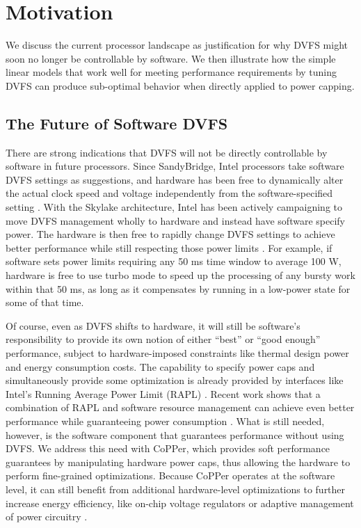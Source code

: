 \section{Motivation}
\label{sec:copper-motivation}

We discuss the current processor landscape as justification for why DVFS might soon no longer be controllable by software.
We then illustrate how the simple linear models that work well for meeting performance requirements by tuning DVFS can produce sub-optimal behavior when directly applied to power capping.


\subsection{The Future of Software DVFS}
There are strong indications that DVFS will not be directly controllable by software in future processors.
Since SandyBridge, Intel processors take software DVFS settings as suggestions, and hardware has been free to dynamically alter the actual clock speed and voltage independently from the software-specified setting \cite{lwn602479,KernelPstate}.
With the Skylake architecture, Intel has been actively campaigning to move DVFS management wholly to hardware and instead have software specify power.
The hardware is then free to rapidly change DVFS settings to achieve better performance while still respecting those power limits \cite{SpeedShift}.
For example, if software sets power limits requiring any 50 ms time window to average 100 W, hardware is free to use turbo mode to speed up the processing of any bursty work within that 50 ms, as long as it compensates by running in a low-power state for some of that time.

Of course, even as DVFS shifts to hardware, it will still be software's responsibility to provide its own notion of either ``best'' or ``good enough'' performance, subject to hardware-imposed constraints like thermal design power and energy consumption costs.
The capability to specify power caps and simultaneously provide some optimization is already provided by interfaces like Intel's Running Average Power Limit (RAPL) \cite{RAPL}.
Recent work shows that a combination of RAPL and software resource management can achieve even better performance while guaranteeing power consumption \cite{pupil}.
What is still needed, however, is the software component that guarantees performance without using DVFS.
We address this need with CoPPer, which provides soft performance guarantees by manipulating hardware power caps, thus allowing the hardware to perform fine-grained optimizations.
Because CoPPer operates at the software level, it can still benefit from additional hardware-level optimizations to further increase energy efficiency, like on-chip voltage regulators \cite{Bai2017} or adaptive management of power circuitry \cite{He2013}.


